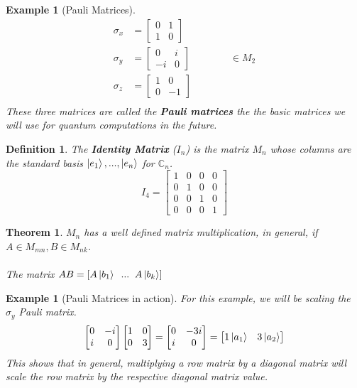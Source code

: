 \documentclass[12pt]{article}
\theoremstyle{plain}
\newtheorem{theorem}[lemma]{Theorem}
\theoremstyle{nonumberplain}
\theoremstyle{plain}
\newtheorem{definition}[lemma]{Definition}
\newtheorem{example}[lemma]{Example}
\theoremstyle{nonumberplain}
\newcommand\1{{\bf 1}}
\newcommand{\bmat}[1]{\begin{bmatrix*} #1 \end{bmatrix*}} %
\newcommand{\C}{\mathbb{C}} %
\newcommand{\<}{\left\langle}
\renewcommand{\>}{\right\rangle}
\begin{document}
\begin{example} [Pauli Matrices]
\begin{equation}
\begin{split}
\sigma_x &= \bmat{0 &1\\ 1 &0}\\
\sigma_y &= \bmat{0 &i\\ -i &0}\qquad\qquad \in M_2\\
\sigma_z &= \bmat{1 &0\\ 0 &-1}\\
\end{split}
\end{equation}
\textit{These three matrices are called the \textbf{Pauli matrices} the the basic matrices we will use for quantum computations in the future.}
\end{example}

\begin{definition}
The \textbf{Identity Matrix} ($I_n$) is the matrix $M_n$ whose columns are the standard basis {$\ket{e_1}, ... , \ket{e_n}$} for $\C_n$.
\begin{equation}
I_4 = \bmat{1 &0 &0 &0\\ 0 &1 &0 &0 \\ 0 &0 &1 &0 \\ 0 &0 &0 &1}
\end{equation}
\end{definition}

\begin{theorem}
$M_n$ has a well defined matrix multiplication, in general, if $A \in M_{mn}, B \in M_{nk}$. \\\\
The matrix $AB = [A\ket{b_1}\;\; ...\;\; A\ket{b_k}]$
\end{theorem}

\begin{example}[Pauli Matrices in action] For this example, we will be scaling the $\sigma_y$ Pauli matrix.
\begin{equation} \renewcommand{\blacklozenge}{•}
\begin{bmatrix}
0 & -i \\
i & 0
\end{bmatrix}\begin{bmatrix}
1 & 0 \\
0 & 3
\end{bmatrix}=\begin{bmatrix}
0 & -3i \\
i & 0
\end{bmatrix}=\bmat{1\ket{a_1} &3\ket{a_2}}
\end{equation}
This shows that in general, multiplying a row matrix by a diagonal matrix will scale the row matrix by the respective diagonal matrix value.
\end{example}
\end{document}
